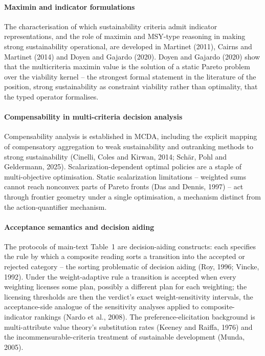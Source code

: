 \paragraph{Maximin and indicator formulations} The characterisation of which sustainability criteria admit indicator representations, and the role of maximin and MSY-type reasoning in making strong sustainability operational, are developed in Martinet (2011), Cairns and Martinet (2014) and Doyen and Gajardo (2020). Doyen and Gajardo (2020) show that the multicriteria maximin value is the solution of a static Pareto problem over the viability kernel -- the strongest formal statement in the literature of the position, strong sustainability as constraint viability rather than optimality, that the typed operator formalises.

\paragraph{Compensability in multi-criteria decision analysis} Compensability analysis is established in MCDA, including the explicit mapping of compensatory aggregation to weak sustainability and outranking methods to strong sustainability (Cinelli, Coles and Kirwan, 2014; Sch\"ar, Pohl and Geldermann, 2025). Scalarization-dependent optimal policies are a staple of multi-objective optimisation. Static scalarization limitations -- weighted sums cannot reach nonconvex parts of Pareto fronts (Das and Dennis, 1997) -- act through frontier geometry under a single optimisation, a mechanism distinct from the action-quantifier mechanism.

\paragraph{Acceptance semantics and decision aiding} The protocols of main-text Table~1 are decision-aiding constructs: each specifies the rule by which a composite reading sorts a transition into the accepted or rejected category -- the sorting problematic of decision aiding (Roy, 1996; Vincke, 1992). Under the weight-adaptive rule a transition is accepted when every weighting licenses some plan, possibly a different plan for each weighting; the licensing thresholds are then the verdict's exact weight-sensitivity intervals, the acceptance-side analogue of the sensitivity analyses applied to composite-indicator rankings (Nardo et al., 2008). The preference-elicitation background is multi-attribute value theory's substitution rates (Keeney and Raiffa, 1976) and the incommensurable-criteria treatment of sustainable development (Munda, 2005).

